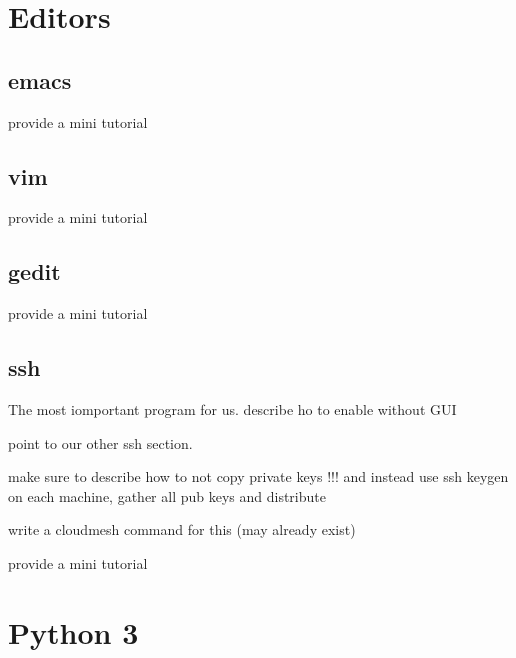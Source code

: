 \section{Editors}

\subsection{emacs}

\begin{exercise}
provide a mini tutorial 
\end{exercise}

\subsection{vim}

\begin{exercise}
provide a mini tutorial 
\end{exercise}

\subsection{gedit}

\begin{exercise}
provide a mini tutorial 
\end{exercise}


\subsection{ssh}

The most iomportant program for us. describe ho to enable without GUI

point to our other ssh section.

\begin{exercise}
make sure to describe how to not copy private keys !!! and instead use
ssh keygen on each machine, gather all pub keys and distribute

write a cloudmesh command for this (may already exist) 
\end{exercise}



\begin{exercise}
provide a mini tutorial 
\end{exercise}




\section{Python 3}

